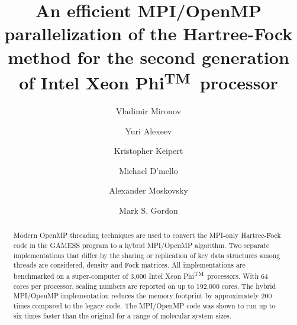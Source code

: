 \documentclass[format=sigconf,screen,authorversion]{acmart}
\newcommand{\intelphireg}{Intel{\textregistered} Xeon Phi\textsuperscript{TM}}
\begin{document}
\title[MPI/OpenMP parallelization of the Hartree-Fock method]{An efficient MPI/OpenMP parallelization of the Hartree-Fock method for the second generation of \intelphireg\ processor}


\author{Vladimir Mironov}
 

\author{Yuri Alexeev}
 

\author{Kristopher Keipert}
 

\author{Michael D'mello}
  

\author{Alexander Moskovsky}
     

\author{Mark S. Gordon}
 


\renewcommand{\shortauthors}{V. Mironov et al.}


\begin{abstract}
Modern OpenMP threading techniques are used to convert the MPI-only Hartree-Fock code in the GAMESS program to a hybrid MPI/OpenMP algorithm. Two separate implementations that differ by the sharing or replication of key data structures among threads are considered, density and Fock matrices. All implementations are benchmarked on a super-computer of 3,000 \intelphireg\ processors. With 64 cores per processor, scaling numbers are reported on up to 192,000 cores. The hybrid MPI/OpenMP implementation reduces the memory footprint by approximately 200 times compared to the legacy code. The MPI/OpenMP code was shown to run up to six times faster than the original for a range of molecular system sizes.
\end{abstract}
\end{document}
